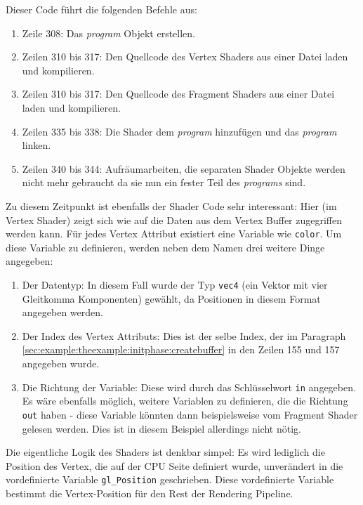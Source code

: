 Dieser Code führt die folgenden Befehle aus:
\begin{enumerate}
    \item Zeile 308: Das \textit{program} Objekt erstellen.
    \item Zeilen 310 bis 317: Den Quellcode des Vertex Shaders aus einer Datei laden und kompilieren.
    \item Zeilen 310 bis 317: Den Quellcode des Fragment Shaders aus einer Datei laden und kompilieren.
    \item Zeilen 335 bis 338: Die Shader dem \textit{program} hinzufügen und das \textit{program} linken.
    \item Zeilen 340 bis 344: Aufräumarbeiten, die separaten Shader Objekte werden nicht mehr gebraucht da sie nun ein fester Teil des \textit{programs} sind. 
\end{enumerate}

Zu diesem Zeitpunkt ist ebenfalls der Shader Code sehr interessant:
Hier (im Vertex Shader) zeigt sich wie auf die Daten aus dem Vertex Buffer zugegriffen werden kann. Für jedes Vertex Attribut existiert eine Variable wie \texttt{color}. Um diese Variable zu definieren, werden neben dem Namen drei weitere Dinge angegeben:
\begin{enumerate}
    \item Der Datentyp: In diesem Fall wurde der Typ \texttt{vec4} (ein Vektor mit vier Gleitkomma Komponenten) gewählt, da Positionen in diesem Format angegeben werden.
    \item Der Index des Vertex Attributs: Dies ist der selbe Index, der im Paragraph \ref{sec:example:theexample:initphase:createbuffer} in den Zeilen 155 und 157 angegeben wurde.
    \item Die Richtung der Variable: Diese wird durch das Schlüsselwort \texttt{in} angegeben. Es wäre ebenfalls möglich, weitere Variablen zu definieren, die die Richtung \texttt{out} haben - diese Variable könnten dann beispielsweise vom Fragment Shader gelesen werden. Dies ist in diesem Beispiel allerdings nicht nötig.
\end{enumerate}

Die eigentliche Logik des Shaders ist denkbar simpel: Es wird lediglich die Position des Vertex, die auf der CPU Seite definiert wurde, unverändert in die vordefinierte Variable \texttt{gl\_Position} geschrieben. Diese vordefinierte Variable bestimmt die Vertex-Position für den Rest der Rendering Pipeline.

